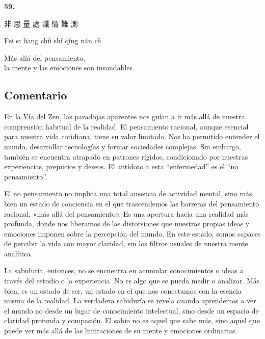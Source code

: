 \documentclass[
  a5paperpaper,
]{article}
\begin{document}
\hfill\break

\hypertarget{04}{}
\begin{verseblock}

\newpage

\begin{center}\textbf{59.}\end{center}

非 思 量 處 識 情 難 測

Fēi sī liang chŭ shí qíng nán cè

Más allá del pensamiento,\\
la mente y las emociones son insondables.

\end{verseblock}

\hfill\break

\hypertarget{comentario-58}{%
\subsection{Comentario}\label{comentario-58}}

En la Vía del Zen, las paradojas aparentes nos guían a ir más allá de
nuestra comprensión habitual de la realidad. El pensamiento racional,
aunque esencial para nuestra vida cotidiana, tiene su valor limitado.
Nos ha permitido entender el mundo, desarrollar tecnologías y formar
sociedades complejas. Sin embargo, también se encuentra atrapado en
patrones rígidos, condicionado por nuestras experiencias, prejuicios y
deseos. El antídoto a esta ``enfermedad'' es el ``no pensamiento''.

El no pensamiento no implica una total ausencia de actividad mental,
sino más bien un estado de conciencia en el que trascendemos las
barreras del pensamiento racional, «más allá del pensamiento». Es una
apertura hacia una realidad más profunda, donde nos liberamos de las
distorsiones que nuestras propias ideas y emociones imponen sobre la
percepción del mundo. En este estado, somos capaces de percibir la vida
con mayor claridad, sin los filtros usuales de nuestra mente analítica.

La sabiduría, entonces, no se encuentra en acumular conocimientos o
ideas a través del estudio o la experiencia. No es algo que se pueda
medir o analizar. Más bien, es un estado de ser, un estado en el que nos
conectamos con la esencia misma de la realidad. La verdadera sabiduría
se revela cuando aprendemos a ver el mundo no desde un lugar de
conocimiento intelectual, sino desde un espacio de claridad profunda y
compasión. El sabio no es aquel que sabe más, sino aquel que puede ver
más allá de las limitaciones de su mente y emociones ordinarias.
\end{document}
